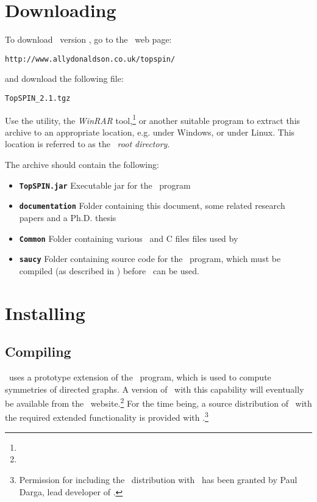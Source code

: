 \section{Downloading}\label{sec:downloadandinstall:downloading}

To download \topspin\ version \topspinversion, go to the \topspin\
web page:
%
\begin{lstlisting}
http://www.allydonaldson.co.uk/topspin/
\end{lstlisting}
%
and download the following file:
%
\begin{lstlisting}
TopSPIN_2.1.tgz
\end{lstlisting}
%
Use the  utility, the \emph{WinRAR}
tool,\footnote{\texttt{\winrarwebsite}} or another suitable program
to extract this archive to an appropriate location, e.g.
 under Windows, or
 under Linux.  This location is
referred to as the \topspin\ \emph{root directory}.

The archive should contain the following:

\begin{itemize}
\item {\bf \texttt{TopSPIN.jar} } Executable jar for the \topspin\ program
\item {\bf \texttt{documentation} } Folder containing this document, some related research papers
and a Ph.D. thesis
\item {\bf \texttt{Common} } Folder containing various \gap\ and C files files used by \topspin
\item {\bf \texttt{saucy} } Folder containing source code for the \saucy\ program, which must be
compiled (as described in
) before
\topspin\ can be used.
\end{itemize}

\section{Installing}\label{sec:downloadandinstall:installation}

\subsection{Compiling \saucy}\label{sec:downloadandinstall:installation:compilingsaucy}

\topspin\ uses a prototype extension of the \saucy\ program, which
is used to compute symmetries of directed graphs.  A version of
\saucy\ with this capability will eventually be available from the
\saucy\ website.\footnote{\texttt{\saucywebpage}} For the time
being, a source distribution of \saucy\ with the required extended
functionality is provided with \topspin.\footnote{Permission for
including the \saucy\ distribution with \topspin\ has been granted
by Paul Darga, lead developer of \saucy.}

